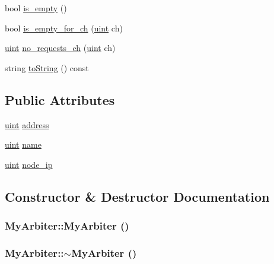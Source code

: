 \begin{CompactItemize}
\item 
bool \hyperlink{classMyArbiter_26d587edddcee3e79772109317124927}{is\_\-empty} ()
\item 
bool \hyperlink{classMyArbiter_5c29ed3eee201fbb92f61e6debc1ba91}{is\_\-empty\_\-for\_\-ch} (\hyperlink{outputBuffer_8h_91ad9478d81a7aaf2593e8d9c3d06a14}{uint} ch)
\item 
\hyperlink{outputBuffer_8h_91ad9478d81a7aaf2593e8d9c3d06a14}{uint} \hyperlink{classMyArbiter_e4e3428f44129f79fc10c5b0f4cd51f4}{no\_\-requests\_\-ch} (\hyperlink{outputBuffer_8h_91ad9478d81a7aaf2593e8d9c3d06a14}{uint} ch)
\item 
string \hyperlink{classMyArbiter_170c7d52952f17cf6e6a00130b503455}{toString} () const 
\end{CompactItemize}
\subsection*{Public Attributes}
\begin{CompactItemize}
\item 
\hyperlink{outputBuffer_8h_91ad9478d81a7aaf2593e8d9c3d06a14}{uint} \hyperlink{classMyArbiter_4e879ce8ea05c997de5a71af66bae3a5}{address}
\item 
\hyperlink{outputBuffer_8h_91ad9478d81a7aaf2593e8d9c3d06a14}{uint} \hyperlink{classMyArbiter_0d635db925d8b449f5978ebeb1cfe923}{name}
\item 
\hyperlink{outputBuffer_8h_91ad9478d81a7aaf2593e8d9c3d06a14}{uint} \hyperlink{classMyArbiter_49b1876be705a202c9243f6ec560eae0}{node\_\-ip}
\end{CompactItemize}


\subsection{Constructor \& Destructor Documentation}
\hypertarget{classMyArbiter_7050348ffbfcaba0645ec071d9695600}{
\subsubsection[{MyArbiter}]{\setlength{\rightskip}{0pt plus 5cm}MyArbiter::MyArbiter ()}}
\label{classMyArbiter_7050348ffbfcaba0645ec071d9695600}


\hypertarget{classMyArbiter_ba1f0d2abd1a1c993f3970a1c135a3c1}{
\subsubsection[{$\sim$MyArbiter}]{\setlength{\rightskip}{0pt plus 5cm}MyArbiter::$\sim$MyArbiter ()}}
\label{classMyArbiter_ba1f0d2abd1a1c993f3970a1c135a3c1}




